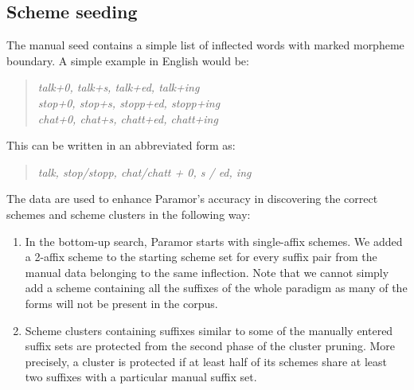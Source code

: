 \documentclass{itatnew}
\newcommand{\e}[1]{\textit{#1}} %
\newcommand{\todoja}[1]{[\textbf{TODOJ} #1]}
\newcommand{\todojd}[1]{} %
\begin{document}
\subsection{Scheme seeding}


\noindent
The manual seed contains a simple list of inflected words with marked morpheme boundary. A simple example in English would be:
\begin{quote}
\e{talk+0, talk+s, talk+ed, talk+ing}\\
\e{stop+0, stop+s, stopp+ed, stopp+ing}\\
\e{chat+0, chat+s, chatt+ed, chatt+ing}
%
\end{quote}

\noindent
This can be written in an abbreviated form as:

\begin{quote}
\e{talk, stop/stopp, chat/chatt +  0, s / ed, ing}
\end{quote}

\noindent
The data are used to enhance Paramor's accuracy in discovering the correct schemes and scheme clusters in the following way:
\begin{enumerate}
\item In the bottom-up search, Paramor starts with single-affix schemes. We added a 2-affix scheme to the starting scheme set for every suffix pair from the manual data belonging to the same inflection. Note that we cannot simply add a scheme containing all the suffixes of the whole paradigm as many of the forms will not be present in the corpus.
    
\item Scheme clusters containing suffixes similar to some of the manually entered suffix sets are protected from the second phase of the cluster pruning. More precisely, a cluster is protected if at least half of its schemes share at least two suffixes with a particular manual suffix set.
\todojd{Is there any reason why half and two, and not, say, 60\% and 3?  \textbf{RK:} Not really -- similar criterion is often used in Paramor so I used it here as well.}



\end{enumerate}
\end{document}
